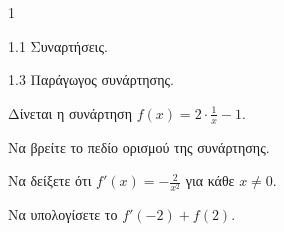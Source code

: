 \begin{ylh}{1}
    \item 1.1 Συναρτήσεις.
    \item 1.3 Παράγωγος συνάρτησης.
\end{ylh}
Δίνεται η συνάρτηση $f(x) = 2 \cdot \frac{1}{x} - 1$.
\begin{alist}
    \item Να βρείτε το πεδίο ορισμού της συνάρτησης. 
    \item Να δείξετε ότι $f'(x) = -\frac{2}{x^2}$ για κάθε $x \neq 0$. 
    \item Να υπολογίσετε το $f'(-2) + f(2)$. 
\end{alist}

